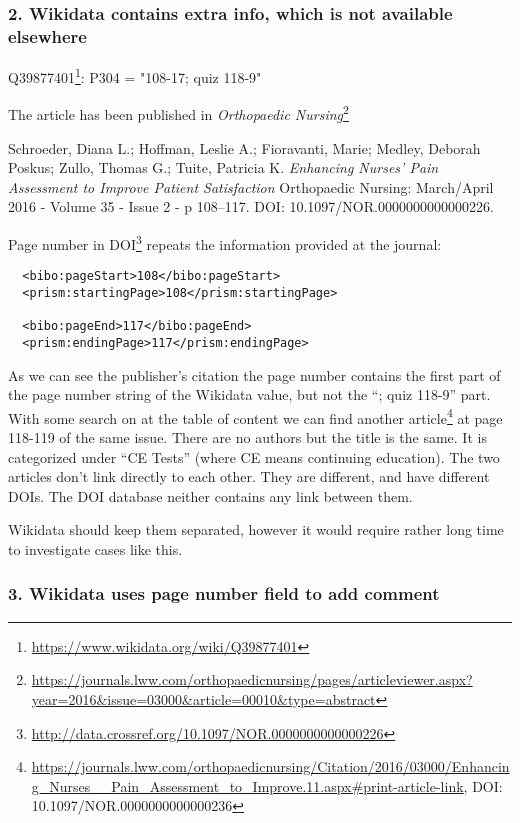 \subsubsection{2. Wikidata contains extra info, which is not available elsewhere}

Q39877401\footnote{\url{https://www.wikidata.org/wiki/Q39877401}}: P304 = "108-17; quiz 118-9"

The article has been published in \emph{Orthopaedic Nursing}\footnote{\url{https://journals.lww.com/orthopaedicnursing/pages/articleviewer.aspx?year=2016&issue=03000&article=00010&type=abstract}}

Schroeder, Diana L.; Hoffman, Leslie A.; Fioravanti, Marie; Medley, Deborah Poskus; Zullo, Thomas G.; Tuite, Patricia K. \emph{Enhancing Nurses' Pain Assessment to Improve Patient Satisfaction} Orthopaedic Nursing: March/April 2016 - Volume 35 - Issue 2 - p 108–117. DOI: 10.1097/NOR.0000000000000226.

Page number in DOI\footnote{\url{http://data.crossref.org/10.1097/NOR.0000000000000226}} repeats the information provided at the journal:

\begin{lstlisting}
  <bibo:pageStart>108</bibo:pageStart>
  <prism:startingPage>108</prism:startingPage>

  <bibo:pageEnd>117</bibo:pageEnd>
  <prism:endingPage>117</prism:endingPage>
\end{lstlisting}

As we can see the publisher's citation the page number contains the first part of the page number string of the Wikidata value, but not the ``; quiz 118-9'' part. With some search on at the table of content we can find another article\footnote{\url{https://journals.lww.com/orthopaedicnursing/Citation/2016/03000/Enhancing_Nurses__Pain_Assessment_to_Improve.11.aspx#print-article-link}, DOI: 10.1097/NOR.0000000000000236} at page 118-119 of the same issue. There are no authors but the title is the same. It is categorized under ``CE Tests'' (where CE means continuing education). The two articles don't link directly to each other. They are different, and have different DOIs. The DOI database neither contains any link between them.

Wikidata should keep them separated, however it would require rather long time to investigate cases like this.

\subsubsection{3. Wikidata uses page number field to add comment}

